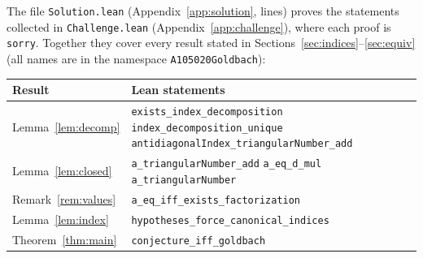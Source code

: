 \documentclass[11pt,a4paper]{article}
\newcommand{\li}{\lstinline[style=inline]}
\theoremstyle{plain}
\theoremstyle{remark}
\begin{document}
The file \li{Solution.lean} (Appendix~\ref{app:solution}, \SolutionLines{} lines)
proves the \NumTheorems{} statements collected in \li{Challenge.lean}
(Appendix~\ref{app:challenge}), where each proof is \li{sorry}. Together they cover
every result stated in Sections~\ref{sec:indices}--\ref{sec:equiv} (all names are in
the namespace \li{A105020Goldbach}):

\begin{center}\small
\begin{tabular}{@{}p{}p{}@{}}
\toprule
Result & Lean statements \\
\midrule
Lemma~\ref{lem:decomp} & \texttt{exists\_index\_decomposition}\newline
  \texttt{index\_decomposition\_unique}\newline
  \texttt{antidiagonalIndex\_triangularNumber\_add} \\
Lemma~\ref{lem:closed} & \texttt{a\_triangularNumber\_add}\newline
  \texttt{a\_eq\_d\_mul}\newline
  \texttt{a\_triangularNumber} \\
Remark~\ref{rem:values} & \texttt{a\_eq\_iff\_exists\_factorization} \\
Lemma~\ref{lem:index} & \texttt{hypotheses\_force\_canonical\_indices} \\
Theorem~\ref{thm:main} & \texttt{conjecture\_iff\_goldbach} \\
\bottomrule
\end{tabular}
\end{center}
\end{document}
